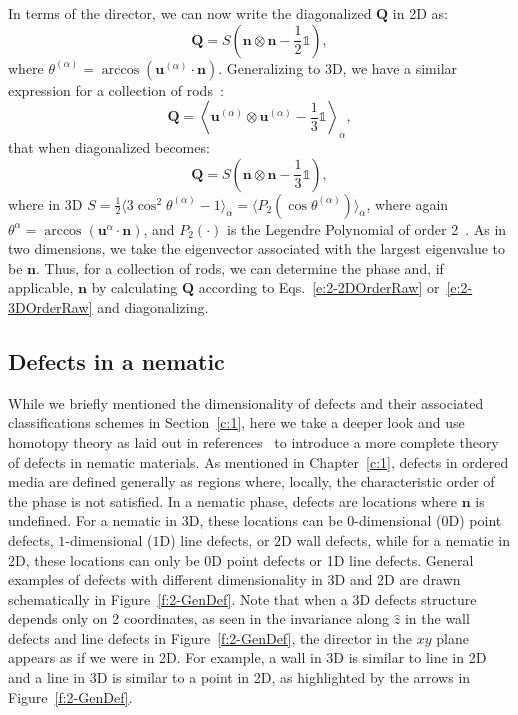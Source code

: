 In terms of the director, we can now write the diagonalized $\mathbf{Q}$ in 2D as:
\begin{equation}
  \mathbf{Q} = S \left ( \mathbf{n} \otimes \mathbf{n} - \frac{1}{2}\mathbb{1} \right ),\label{e:2-2DOrderDiag}
\end{equation}
where $\theta^{(\alpha)} = \arccos (\mathbf{u}^{(\alpha)} \cdot \mathbf{n})$.
Generalizing to 3D, we have a similar expression for a collection of rods~\cite{RN33}:
\begin{equation}
  \mathbf{Q} =  \left \langle \mathbf{u}^{(\alpha)} \otimes \mathbf{u}^{(\alpha)} - \frac{1}{3} \mathbb{1} \right \rangle_{\alpha},\label{e:2-3DOrderRaw}
\end{equation}
that when diagonalized becomes:
\begin{equation}
  \mathbf{Q} = S \left ( \mathbf{n} \otimes \mathbf{n} - \frac{1}{3}\mathbb{1} \right ),\label{e:2-3DOrderDiag}
\end{equation}
where in 3D $S = \frac{1}{2} \big \langle 3 \cos^2 \theta^{(\alpha)}  - 1 \big  \rangle_{\alpha} = \big \langle P_2(\cos \theta^{(\alpha)}) \big \rangle_{\alpha} $,
where again $\theta^{\alpha} = \arccos (\mathbf{u}^{\alpha} \cdot \mathbf{n})$, and $P_2(\cdot)$ is the Legendre Polynomial of order 2~\cite{RN33,RN175}.
As in two dimensions, we take the eigenvector associated with the largest eigenvalue to be $\mathbf{n}$.
Thus, for a collection of rods, we can determine the phase and, if applicable, $\mathbf{n}$ by calculating $\mathbf{Q}$ according to Eqs.~\ref{e:2-2DOrderRaw} or~\ref{e:2-3DOrderRaw} and diagonalizing.


\subsection{Defects in a nematic}
While we briefly mentioned the dimensionality of defects and their associated classifications schemes in Section~\ref{c:1}, here we take a deeper look and use homotopy theory as laid out in references~\cite{RN196,RN236,RN153} to introduce a more complete theory of defects in nematic materials.
As mentioned in Chapter~\ref{c:1}, defects in ordered media are defined generally as regions where, locally, the characteristic order of the phase is not satisfied.
In a nematic phase, defects are locations where $\mathbf{n}$ is undefined.
For a nematic in 3D, these locations can be $0$-dimensional ($0$D) point defects, $1$-dimensional ($1$D) line defects, or $2$D wall defects, while for a nematic in 2D, these locations can only be 0D point defects or 1D line defects.
General examples of defects with different dimensionality  in 3D and 2D are drawn schematically in Figure~\ref{f:2-GenDef}.
Note that when a 3D defects structure depends only on 2 coordinates, as seen in the invariance along $\hat{z}$ in the wall defects and line defects in Figure~\ref{f:2-GenDef}, the director in the $xy$ plane appears as if we were in 2D.
For example, a wall in 3D is similar to line in 2D and a line in 3D is similar to a point in 2D, as highlighted by the arrows in Figure~\ref{f:2-GenDef}.

